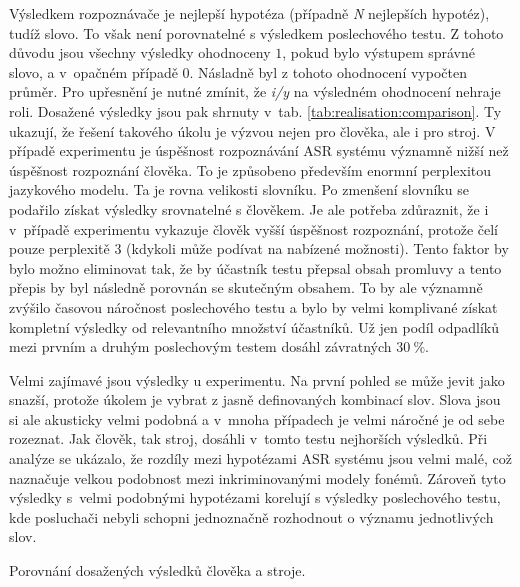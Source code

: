 Výsledkem rozpoznávače je nejlepší hypotéza (případně \textit{N} nejlepších hypotéz), tudíž slovo.
To však není porovnatelné s výsledkem poslechového testu.
Z tohoto důvodu jsou všechny výsledky ohodnoceny $1$, pokud bylo výstupem správné slovo, a v~opačném případě $0$.
Násladně byl z tohoto ohodnocení vypočten průměr.
Pro upřesnění je nutné zmínit, že \textit{i/y} na výsledném ohodnocení nehraje roli.
Dosažené výsledky jsou pak shrnuty v~tab. \ref{tab:realisation:comparison}.
Ty ukazují, že řešení takového úkolu je výzvou nejen pro člověka, ale i pro stroj.
V případě experimentu  je úspěšnost rozpoznávání ASR systému významně nižší než úspěšnost rozpoznání člověka.
To je způsobeno především enormní perplexitou jazykového modelu.
Ta je rovna velikosti slovníku.
Po zmenšení slovníku se podařilo získat výsledky srovnatelné s člověkem.
Je ale potřeba zdůraznit, že i v~případě  experimentu vykazuje člověk vyšší úspěšnost rozpoznání, protože čelí pouze perplexitě $3$ (kdykoli může podívat na nabízené možnosti).
Tento faktor by bylo možno eliminovat tak, že by účastník testu přepsal obsah promluvy a tento přepis by byl následně porovnán se skutečným obsahem.
To by ale významně zvýšilo časovou náročnost poslechového testu a bylo by velmi komplivané získat kompletní výsledky od relevantního množství účastníků.
Už jen podíl odpadlíků mezi prvním a druhým poslechovým testem dosáhl závratných $30\ \%$.

Velmi zajímavé jsou výsledky u  experimentu.
Na první pohled se může jevit jako snazší, protože úkolem je vybrat z jasně definovaných kombinací slov.
Slova jsou si ale akusticky velmi podobná a v~mnoha případech je velmi náročné je od sebe rozeznat.
Jak člověk, tak stroj, dosáhli v~tomto testu nejhorších výsledků.
Při analýze se ukázalo, že rozdíly mezi hypotézami ASR systému jsou velmi malé, což naznačuje velkou podobnost mezi inkriminovanými modely fonémů.
Zároveň tyto výsledky s~velmi podobnými hypotézami korelují s výsledky poslechového testu, kde posluchači nebyli schopni jednoznačně rozhodnout o významu jednotlivých slov.

\begin{table}[htpb]
  \centering
  \def\arraystretch{1.5}
  \caption{Porovnání dosažených výsledků člověka a stroje.}
  \label{tab:realisation:comparison}
\end{table}

